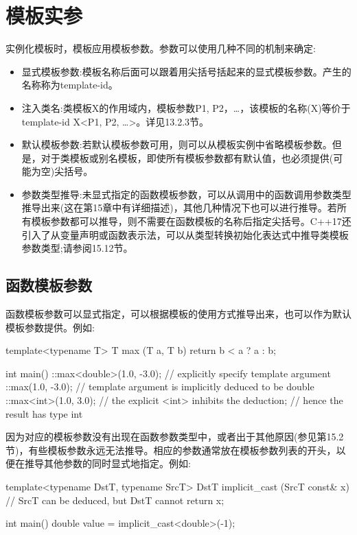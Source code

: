 \section{模板实参}

实例化模板时，模板应用模板参数。参数可以使用几种不同的机制来确定:

\begin{itemize}
\item 
显式模板参数:模板名称后面可以跟着用尖括号括起来的显式模板参数。产生的名称称为template-id。

\item 
注入类名:类模板X的作用域内，模板参数P1, P2，…，该模板的名称(X)等价于template-id X<P1, P2, …>。详见13.2.3节。

\item 
默认模板参数:若默认模板参数可用，则可以从模板实例中省略模板参数。但是，对于类模板或别名模板，即使所有模板参数都有默认值，也必须提供(可能为空)尖括号。

\item 
参数类型推导:未显式指定的函数模板参数，可以从调用中的函数调用参数类型推导出来(这在第15章中有详细描述)，其他几种情况下也可以进行推导。若所有模板参数都可以推导，则不需要在函数模板的名称后指定尖括号。C++17还引入了从变量声明或函数表示法，可以从类型转换初始化表达式中推导类模板参数类型;请参阅15.12节。
\end{itemize}

\subsection{函数模板参数}

函数模板参数可以显式指定，可以根据模板的使用方式推导出来，也可以作为默认模板参数提供。例如:

\begin{cpp}
template<typename T>
T max (T a, T b)
{
	return b < a ? a : b;
}

int main()
{
	::max<double>(1.0, -3.0); // explicitly specify template argument
	::max(1.0, -3.0); // template argument is implicitly deduced to be double
	::max<int>(1.0, 3.0); // the explicit <int> inhibits the deduction;
	// hence the result has type int
}
\end{cpp}

因为对应的模板参数没有出现在函数参数类型中，或者出于其他原因(参见第15.2节)，有些模板参数永远无法推导。相应的参数通常放在模板参数列表的开头，以便在推导其他参数的同时显式地指定。例如:

\begin{cpp}
template<typename DstT, typename SrcT>
DstT implicit_cast (SrcT const& x) // SrcT can be deduced, but DstT cannot
{
	return x;
}

int main()
{
	double value = implicit_cast<double>(-1);
}
\end{cpp}


